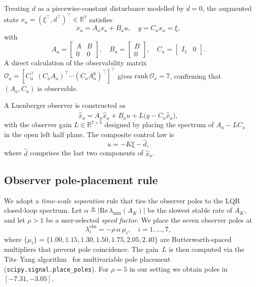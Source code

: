\documentclass[conference]{IEEEtran}
\newcommand{\R}{\mathbb{R}}
\begin{document}
Treating $d$ as a piecewise-constant disturbance modelled by $\dot d=0$, the
augmented state $x_a=(\xi^\top, d^\top)^\top\in\R^7$ satisfies
\begin{equation}
\dot x_a=A_a x_a+B_a u,\quad y=C_a x_a=\xi,
\label{eq:aug}
\end{equation}
with
\begin{equation}
A_a=\begin{bmatrix}A & B\\ 0 & 0\end{bmatrix},\quad
B_a=\begin{bmatrix}B\\ 0\end{bmatrix},\quad
C_a=\begin{bmatrix}I_5 & 0\end{bmatrix}.
\end{equation}
A direct calculation of the observability matrix
$\mathcal{O}_a=[C_a^\top\;(C_aA_a)^\top\cdots(C_aA_a^6)^\top]^\top$ gives
$\mathrm{rank}\,\mathcal{O}_a=7$, confirming that $(A_a,C_a)$ is observable.

A Luenberger observer is constructed as
\begin{equation}
\dot{\hat x}_a=A_a\hat x_a+B_a u+L\bigl(y-C_a\hat x_a\bigr),
\label{eq:obs}
\end{equation}
with the observer gain $L\in\R^{7\times 5}$ designed by placing the
spectrum of $A_a-LC_a$ in the open left half plane. The composite control
law is
\begin{equation}
u=-K\xi-\hat d,
\label{eq:cmd}
\end{equation}
where $\hat d$ comprises the last two components of $\hat x_a$.

\subsection{Observer pole-placement rule}

We adopt a \emph{time-scale separation} rule that ties the observer poles
to the LQR closed-loop spectrum. Let
$\alpha\triangleq|\mathrm{Re}\,\lambda_{\min}(A_K)|$ be the slowest
stable rate of $A_K$, and let $\rho>1$ be a user-selected \emph{speed
factor}. We place the seven observer poles at
\begin{equation}
\lambda_i^{\mathrm{obs}}=-\rho\,\alpha\,\mu_i,\quad i=1,\dots,7,
\label{eq:obsrule}
\end{equation}
where $\{\mu_i\}=\{1.00,1.15,1.30,1.50,1.75,2.05,2.40\}$ are
Butterworth-spaced multipliers that prevent pole coincidence. The
gain~$L$ is then computed via the Tits--Yang
algorithm~\cite{kautsky1985robust} for multivariable pole placement
(\texttt{scipy.signal.place\_poles}). For $\rho=5$ in our setting we obtain
poles in $[-7.31,-3.05]$.
\end{document}
